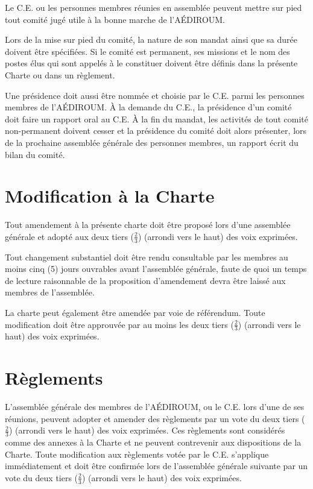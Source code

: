 \documentclass{aediroum}
\begin{document}
Le C.E. ou les personnes membres réunies en assemblée peuvent mettre sur pied tout comité jugé utile à la bonne marche de l'AÉDIROUM.

Lors de la mise sur pied du comité, la nature de son mandat ainsi que sa durée doivent être spécifiées. Si le comité est permanent, ses missions et le nom des postes élus qui sont appelés à le constituer doivent être définis dans la présente Charte ou dans un règlement.

Une présidence doit aussi être nommée et choisie par le C.E. parmi les personnes membres de l'AÉDIROUM. À la demande du C.E., la présidence d'un comité doit faire un rapport oral au C.E. À la fin du mandat, les activités de tout comité non-permanent
doivent cesser et la présidence du comité doit alors présenter, lors de la prochaine assemblée générale des personnes membres, un rapport écrit du bilan du comité.

\section{Modification à la Charte}\label{sec:modification-a-la-charte}

Tout amendement à la présente charte doit être proposé lors d'une assemblée générale et adopté aux deux tiers (\( \frac{2}{3} \)) (arrondi vers le haut) des voix exprimées.

Tout changement substantiel doit être rendu consultable par les membres au moins
cinq (5) jours ouvrables avant l’assemblée générale, faute de quoi un temps de lecture
raisonnable de la proposition d’amendement devra être laissé aux membres de l’assemblée.

La charte peut également être amendée par voie de référendum. Toute modification doit être approuvée par au moins les deux tiers (\( \frac{2}{3} \)) (arrondi vers le haut) des voix exprimées.

\section{Règlements}\label{sec:reglements}

L’assemblée générale des membres de l’AÉDIROUM, ou le C.E. lors d’une de ses réunions, peuvent adopter et amender des règlements par un vote du deux tiers (\( \frac{2}{3} \)) (arrondi vers le haut) des voix exprimées. Ces règlements sont considérés comme des annexes à la Charte et ne peuvent contrevenir aux dispositions de la Charte. Toute modification aux règlements votée par le C.E. s’applique immédiatement et doit être confirmée lors de l’assemblée générale suivante par un vote du deux tiers (\( \frac{2}{3} \)) (arrondi vers le haut) des voix exprimées.
\end{document}

